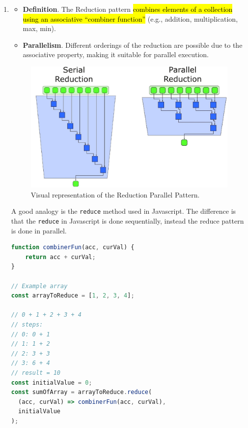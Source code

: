 \begin{enumerate}
    \item {}
    \begin{itemize}
        \item[\textcolor{Red2}{\faIcon{book}}] \textcolor{Red2}{\textbf{Definition}}. The Reduction pattern \hl{combines elements of a collection using an associative ``combiner function''} (e.g., addition, multiplication, max, min).

        \item[\textcolor{Green3}{\faIcon{tachometer-alt}}] \textcolor{Green3}{\textbf{Parallelism}}. Different orderings of the reduction are possible due to the associative property, making it suitable for parallel execution.
    \end{itemize}
    \begin{figure}[!htp]
        \centering
        \includegraphics[width=.84\textwidth]{img/reduction-pattern-1.pdf}
        \caption{Visual representation of the Reduction Parallel Pattern.}
    \end{figure}
    \begin{examplebox}
        A good analogy is the \texttt{reduce} method used in Javascript. The difference is that the \texttt{reduce} in Javascript is done sequentially, instead the reduce pattern is done in parallel.
        \begin{lstlisting}[language=JavaScript]
function combinerFun(acc, curVal) {
    return acc + curVal;
}

// Example array
const arrayToReduce = [1, 2, 3, 4];

// 0 + 1 + 2 + 3 + 4
// steps:
// 0: 0 + 1
// 1: 1 + 2
// 2: 3 + 3
// 3: 6 + 4
// result = 10
const initialValue = 0;
const sumOfArray = arrayToReduce.reduce(
  (acc, curVal) => combinerFun(acc, curVal),
  initialValue
);


\end{lstlisting}
\end{examplebox}
\end{enumerate}
